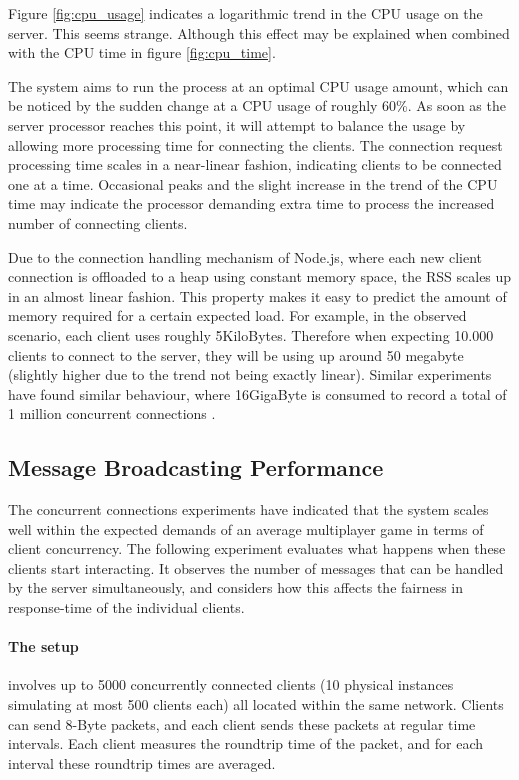 \documentclass[bsc,frontabs,twoside,singlespacing,parskip,deptreport]{infthesis}     %
\begin{document}
Figure \ref{fig:cpu_usage} indicates a logarithmic trend in the CPU usage on the server. This seems strange. Although this effect may be explained when combined with the CPU time in figure \ref{fig:cpu_time}. 

The system aims to run the process at an optimal CPU usage amount, which can be noticed by the sudden change at a CPU usage of roughly 60\%. As soon as the server processor reaches this point, it will attempt to balance the usage by allowing more processing time for connecting the clients. The connection request processing time scales in a near-linear fashion, indicating clients to be connected one at a time. Occasional peaks and the slight increase in the trend of the CPU time may indicate the processor demanding extra time to process the increased number of connecting clients.

Due to the connection handling mechanism of Node.js, where each new client connection is offloaded to a heap using constant memory space, the RSS scales up in an almost linear fashion. This property makes it easy to predict the amount of memory required for a certain expected load. For example, in the observed scenario, each client uses roughly 5KiloBytes. Therefore when expecting 10.000 clients to connect to the server, they will be using up around 50 megabyte (slightly higher due to the trend not being exactly linear). Similar experiments have found similar behaviour, where 16GigaByte is consumed to record a total of 1 million concurrent connections \cite{modejs_1m_connections}.


\subsection{Message Broadcasting Performance}
The concurrent connections experiments have indicated that the system scales well within the expected demands of an average multiplayer game in terms of client concurrency. The following experiment evaluates what happens when these clients start interacting. It observes the number of messages that can be handled by the server simultaneously, and considers how this affects the fairness in response-time of the individual clients.

\paragraph*{The setup}involves up to 5000 concurrently connected clients (10 physical instances simulating at most 500 clients each) all located within the same network. Clients can send 8-Byte packets, and each client sends these packets at regular time intervals. Each client measures the roundtrip time of the packet, and for each interval these roundtrip times are averaged.
\end{document}
